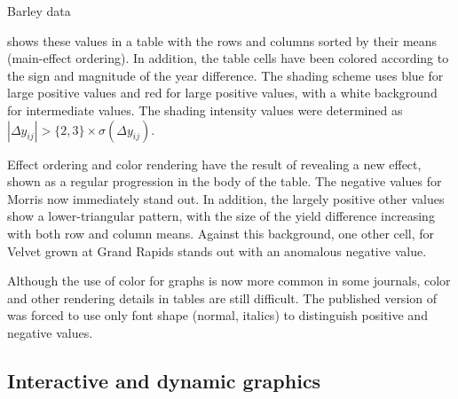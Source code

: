 \documentclass[11pt]{book}
\renewenvironment{knitrout}{\small\renewcommand{\baselinestretch}{.85}}{} %
\begin{document}
\begin{Example}[barley]{Barley data}
\begin{knitrout}
\color{fgcolor}\begin{kframe}
\begin{alltt}
 \hlkwb{<-} \hlopt{$} \hlstd{(}\hlstd{,} \hlstd{,} \hlstd{))}
 \hlkwb{<-} \hlstd{(}
   \hlstd{=} \hlopt{$}
   \hlstd{=} \hlopt{$}
   \hlstd{=} \hlopt{$}
 \hlkwb{<-} \hlstd{(yield[,,}\hlstd{]} \hlopt{-} \hlstd{yield[,,}\hlstd{])}
\end{alltt}
\end{kframe}
\end{knitrout}



 shows these values in a table with the rows and columns
sorted by their means (main-effect ordering).  In addition, the table cells
have been colored according to the sign and magnitude of the year difference.
The shading scheme uses blue for large positive values and red for large
positive values, with a white background for intermediate values.
The shading intensity values were determined as 
$| \Delta y_{ij} |> \{2, 3\} \times \widehat{\sigma} (\Delta y_{ij} )$.

Effect ordering and color rendering
have the result of revealing a new effect, shown as a regular progression
in the body of the table.
The negative values for Morris now immediately stand out.  In addition,
the largely positive other values show a lower-triangular pattern,
with the size of the yield difference increasing with both row and column means.
Against this background, one other cell, for Velvet grown at Grand Rapids stands out
with an anomalous negative value.

Although the use of color for graphs is now more common in some journals, 
color and other rendering details in tables are still difficult.
The published version of  \citep[Table 3]{FriendlyKwan:02:effect}
was forced to use only font shape (normal, italics) to distinguish positive and
negative values.

\end{Example}

\subsection{Interactive and dynamic graphics}\label{sec:intro-interactive}
\end{document}
